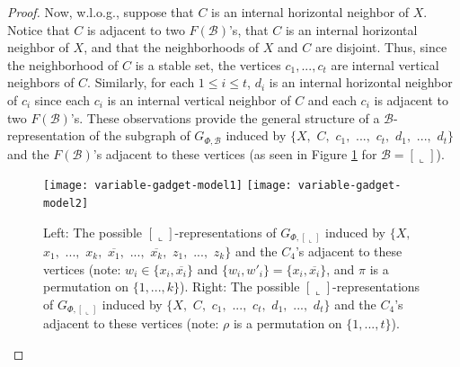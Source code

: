 \documentclass[11pt,3p,times]{elsarticle}
\newenvironment{myproof}{\begin{proof}}{\end{proof}}
\newcommand{\La}{\ensuremath{\llcorner}} \newcommand{\Lb}{\ensuremath{\ulcorner}} \newcommand{\Lc}{\ensuremath{\lrcorner}} \newcommand{\Ld}{\ensuremath{\urcorner}}
\begin{document}
\begin{myproof}
Now, w.l.o.g., suppose that $C$ is an internal horizontal neighbor
of $X$. Notice that $C$ is adjacent to two $F(\mathcal{B})$'s, that $C$ is an internal
horizontal neighbor of $X$, and that the neighborhoods of $X$ and $C$
are disjoint. Thus, since the neighborhood of $C$ is a stable set,
the vertices $c_1, ..., c_t$ are internal vertical neighbors of
$C$. Similarly, for each $1\leq i \leq t$, $d_i$ is an internal
horizontal neighbor of $c_i$ since each $c_i$ is an internal
vertical neighbor of $C$ and each $c_i$ is adjacent to two $F(\mathcal{B})$'s.
These observations provide the general structure of a
$\mathcal{B}$-representation of the subgraph of $G_{\Phi,\mathcal{B}}$ induced by
$\{X,$ $C,$ $c_1,$ $...,$ $c_t,$ $d_1,$ $...,$ $d_t\}$ and the
$F(\mathcal{B})$'s adjacent to these vertices (as seen in Figure
\ref{fig:var-gadget} for $\mathcal{B}=[\La]$).
\begin{figure}[h]
\hfill
\texttt{[image: variable-gadget-model1]}
\hfill
\texttt{[image: variable-gadget-model2]}
\hfill \ 
\caption{Left: The possible $[\La]$-representations of $G_{\Phi,[\La]}$
induced by $\{X,$ $x_1,$ $...,$ $x_k,$ $\overline{x_1},$ $...,$
$\overline{x_k},$ $z_1,$ $...,$ $z_k\}$ and the $C_4$'s adjacent to
these vertices (note: $w_i \in \{x_i, \overline{x_i}\}$ and
$\{w_i, w'_i\} = \{x_i, \overline{x_i}\}$, and $\pi$ is a
permutation on $\{1, ..., k\}$). Right: The possible
$[\La]$-representations of $G_{\Phi,[\La]}$ induced by $\{X,$ $C,$ $c_1,$
$...,$ $c_t,$ $d_1,$ $...,$ $d_t\}$ and the $C_4$'s adjacent to
these vertices (note: $\rho$ is a permutation on $\{1, ...,
t\}$).} \label{fig:var-gadget}
\end{figure}




\end{myproof}
\end{document}
